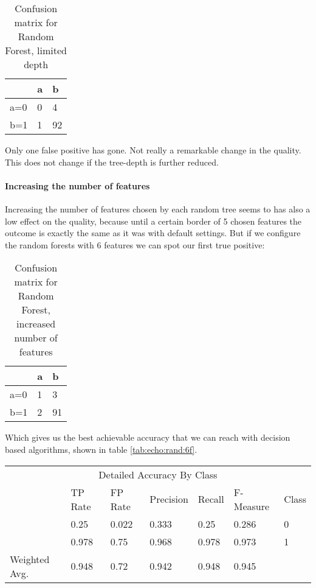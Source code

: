 \documentclass[paper=a4, fontsize=11pt]{scrartcl} %
\numberwithin{equation}{section} %
\numberwithin{figure}{section} %
\numberwithin{table}{section} %
\begin{document}
\begin{table}[h]
\centering
\begin{tabular}{|l|ll|}
\hline
 & a &	b \\
\hline
a=0 & 0 & 4 \\
b=1 & 1 & 92\\
\hline
\end{tabular}
\caption{Confusion matrix for Random Forest, limited depth}
\end{table}

Only one false positive has gone. Not really a remarkable change in the quality. This does not change if the tree-depth is further reduced.
\paragraph{Increasing the number of features}
Increasing the number of features chosen by each random tree seems to has also a low effect on the quality, because until a certain border of 5 chosen features the outcome is exactly the same as it was with default settings. But if we configure the random forests with 6 features we can spot our first true positive:

\begin{table}[h]
\centering
\begin{tabular}{|l|ll|}
\hline
 & a &	b \\
\hline
a=0 & 1 & 3 \\
b=1 & 2 & 91\\
\hline
\end{tabular}
\caption{Confusion matrix for Random Forest, increased number of features}
\end{table}

Which gives us the best achievable accuracy that we can reach with decision based algorithms, shown in table \ref{tab:echo:rand:6f}.
\begin{table*}[htb]\centering
    \begin{tabular*}{\columnwidth}{@{}lllllll@{}}
        \toprule 
        \multicolumn{7}{c}{Detailed Accuracy By Class} \\ 
               &  TP Rate &  FP Rate &  Precision &  Recall &  F-Measure &  Class \\ \midrule
               &  0.25    &  0.022   &  0.333     &  0.25   &  0.286     &  0     \\
               &  0.978   &  0.75    &  0.968     &  0.978  &  0.973     &  1     \\
Weighted Avg.  &  0.948   &  0.72    &  0.942     &  0.948  &  0.945     &        \\ \bottomrule
    \end{tabular*}
\caption{Random Forest -- 6 randomly chosen features} 
\label{tab:echo:rand:6f}
\end{table*}
\FloatBarrier
\end{document}

